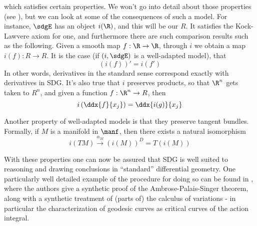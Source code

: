 which satisfies certain properties. We won't go into detail about those properties (see \cite{kock06}), but we can look at some of the consequences of such a model. For instance, \( \sdgE \) has an object \( i(\R) \), and this will be our \( R \). It satisfies the Kock-Lawvere axiom for one, and furthermore there are such comparison results such as the following. Given a smooth map \( f:\R\to\R \), through \( i \) we obtain a map \( i(f):R\to R \). It is the case (if \( (i,\sdgE) \) is a well-adapted model), that
\begin{equation*}
  (i(f))' = i(f')
\end{equation*}
In other words, derivatives in the standard sense correspond exactly with derivatives in SDG. It's also true that \( i \) preserves products, so that \( \R^n \) gets taken to \( R^n \), and given a function \( f:\R^n\to R \), then
\begin{equation*}
  i\left( \ddx{f}{x_j} \right) = \ddx{i(g)}{x_j}
\end{equation*}

Another property of well-adapted models is that they preserve tangent bundles. Formally, if \( M \) is a manifold in \( \manf \), then there exists a natural isomorphism
\begin{equation*}
  i(TM)\stackrel{\alpha_M}{\to} (i(M))^D = T(i(M))
\end{equation*}

With these properties one can now be assured that SDG is well suited to reasoning and drawing conclusions in ``standard'' differential geometry. One particularly well detailed example of the procedure for doing so can be found in \cite{bun17}, where the authors give a synthetic proof of the Ambrose-Palais-Singer theorem, along with a synthetic treatment of (parts of) the calculus of variations - in particular the characterization of geodesic curves as critical curves of the action integral.
